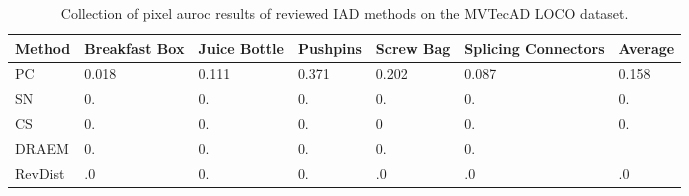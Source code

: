 \begin{table}[htbp]
    \tiny
    \centering
    \begin{tabularx}{\textwidth}{|X|X|X|X|X|X|X|}%
        \hline
        \textbf{Method} & \textbf{Breakfast Box} & \textbf{Juice Bottle} & \textbf{Pushpins} & \textbf{Screw Bag} & \textbf{Splicing Connectors} & \textbf{Average} \\
        \hline
        PC \cite{patchCore2022} & 0.018 & 0.111 & 0.371 & 0.202 & 0.087 & 0.158 \\
        \hline 
        SN \cite{liu2023simplenet} & 0. & 0. & 0. & 0. & 0. & 0. \\
        \hline %
        CS \cite{csflow2022} & 0. & 0. & 0. & 0 & 0. & 0. \\
        \hline
        DRAEM \cite{Zavrtanik_2021DRAEM} & 0. & 0. & 0. & 0. & 0. &  \\
        \hline
        RevDist \cite{revdist2023} & .0 & 0. & 0. & .0 & .0 & .0 \\
        \hline
    \end{tabularx}
    \caption{Collection of pixel auroc results of reviewed IAD methods on the MVTecAD LOCO \cite{LOCODentsAndScratchesBergmann2022} dataset.}
    \label{tab:sproloco}
\end{table}


